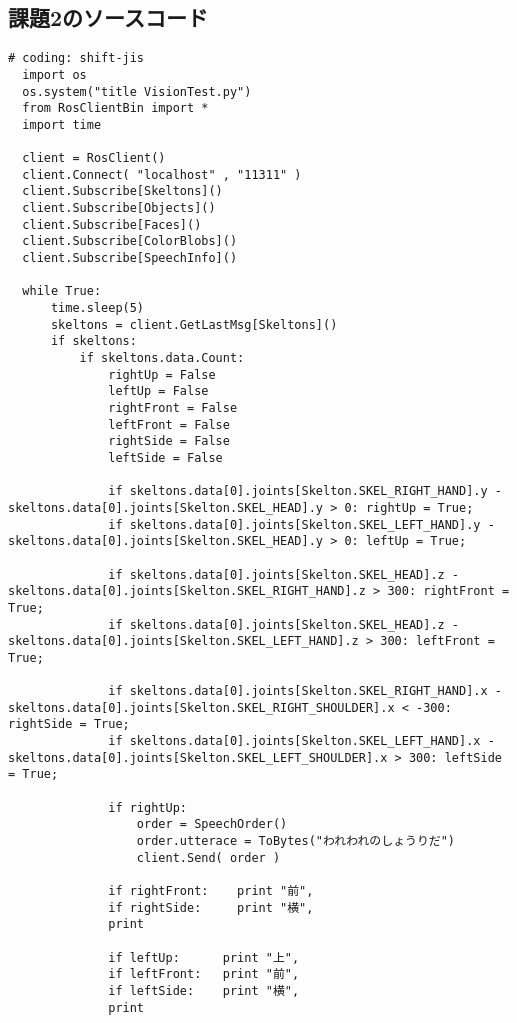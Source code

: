 \documentclass[10pt,a4j]{jsarticle}
\begin{document}
\subsection{課題2のソースコード}
\begin{lstlisting}[caption=VisionTest.py, label=p4_txt]
  # coding: shift-jis
  import os
  os.system("title VisionTest.py")
  from RosClientBin import *
  import time
  
  client = RosClient()
  client.Connect( "localhost" , "11311" )
  client.Subscribe[Skeltons]()
  client.Subscribe[Objects]()
  client.Subscribe[Faces]()
  client.Subscribe[ColorBlobs]()
  client.Subscribe[SpeechInfo]()
  
  while True:
      time.sleep(5)
      skeltons = client.GetLastMsg[Skeltons]()
      if skeltons:
          if skeltons.data.Count:
              rightUp = False
              leftUp = False
              rightFront = False
              leftFront = False
              rightSide = False
              leftSide = False
  
              if skeltons.data[0].joints[Skelton.SKEL_RIGHT_HAND].y - skeltons.data[0].joints[Skelton.SKEL_HEAD].y > 0: rightUp = True;
              if skeltons.data[0].joints[Skelton.SKEL_LEFT_HAND].y - skeltons.data[0].joints[Skelton.SKEL_HEAD].y > 0: leftUp = True;
  
              if skeltons.data[0].joints[Skelton.SKEL_HEAD].z - skeltons.data[0].joints[Skelton.SKEL_RIGHT_HAND].z > 300: rightFront = True;
              if skeltons.data[0].joints[Skelton.SKEL_HEAD].z - skeltons.data[0].joints[Skelton.SKEL_LEFT_HAND].z > 300: leftFront = True;
  
              if skeltons.data[0].joints[Skelton.SKEL_RIGHT_HAND].x - skeltons.data[0].joints[Skelton.SKEL_RIGHT_SHOULDER].x < -300: rightSide = True;
              if skeltons.data[0].joints[Skelton.SKEL_LEFT_HAND].x - skeltons.data[0].joints[Skelton.SKEL_LEFT_SHOULDER].x > 300: leftSide = True;
  
              if rightUp:
                  order = SpeechOrder()
                  order.utterace = ToBytes("われわれのしょうりだ")
                  client.Send( order )
  
              if rightFront:    print "前",
              if rightSide:     print "横",
              print
  
              if leftUp:      print "上",
              if leftFront:   print "前",
              if leftSide:    print "横",
              print
  

\end{lstlisting}
\end{document}
